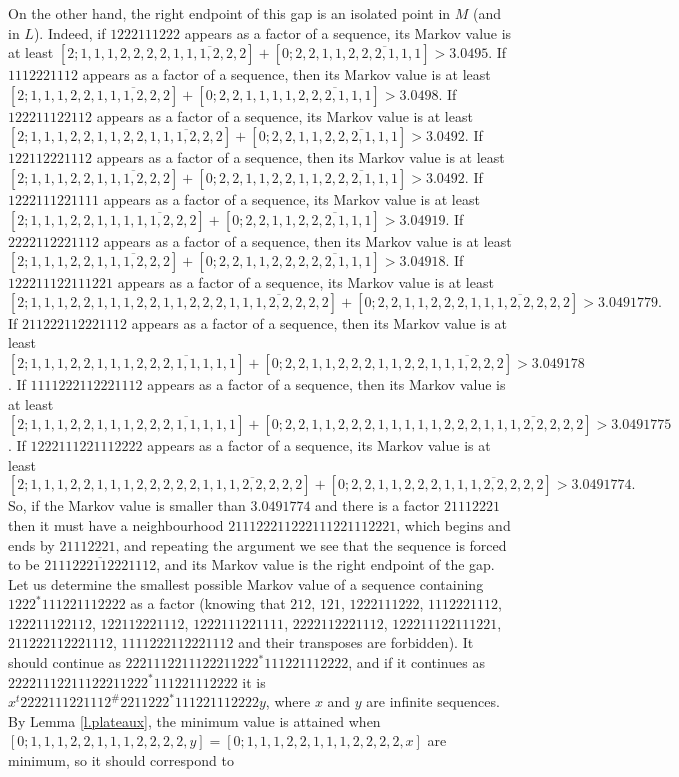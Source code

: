 \documentclass[10pt]{amsart}
\numberwithin{equation}{section}
\theoremstyle{definition}
\begin{document}
On the other hand, the right endpoint of this gap is an isolated point in $M$ (and in $L$). Indeed, if $1222111222$ appears as a factor of a sequence, its Markov value is at least $[2;1,1,1,2,2,2,2,\overline{1,1,1,2,2,2}]+[0;2,2,1,1,\overline{2,2,2,1,1,1}]>3.0495$. If $1112221112$ appears as a factor of a sequence, then its Markov value is at least $[2;1,1,1,2,2,\overline{1,1,1,2,2,2}]+[0;2,2,1,1,1,1,\overline{2,2,2,1,1,1}]>3.0498$. If $122211122112$ appears as a factor of a sequence, its Markov value is at least $[2;1,1,1,2,2,1,1,2,2,\overline{1,1,1,2,2,2}]+[0;2,2,1,1,\overline{2,2,2,1,1,1}]>3.0492$. If $122112221112$ appears as a factor of a sequence, then its Markov value is at least $[2;1,1,1,2,2,\overline{1,1,1,2,2,2}]+[0;2,2,1,1,2,2,1,1,\overline{2,2,2,1,1,1}]>3.0492$. If $1222111221111$ appears as a factor of a sequence, its Markov value is at least $[2;1,1,1,2,2,1,1,\overline{1,1,1,2,2,2}]+[0;2,2,1,1,\overline{2,2,2,1,1,1}]>3.04919$. If $2222112221112$ appears as a factor of a sequence, then its Markov value is at least $[2;1,1,1,2,2,\overline{1,1,1,2,2,2}]+[0;2,2,1,1,2,2,\overline{2,2,2,1,1,1}]>3.04918$. If $122211122111221$ appears as a factor of a sequence, its Markov value is at least $$[2;1,1,1,2,2,1,1,1,2,2,1,1,2,2,2,\overline{1,1,1,2,2,2,2,2}]+[0;2,2,1,1,2,2,2,\overline{1,1,1,2,2,2,2,2}]>3.0491779.$$ If $211222112221112$ appears as a factor of a sequence, then its Markov value is at least $[2;1,1,1,2,2,1,1,1,\overline{2,2,2,1,1,1,1,1}]+[0;2,2,1,1,2,2,2,1,1,2,2,\overline{1,1,1,2,2,2}]>3.049178$. If $1111222112221112$ appears as a factor of a sequence, then its Markov value is at least $[2;1,1,1,2,2,1,1,1,\overline{2,2,2,1,1,1,1,1}]+[0;2,2,1,1,2,2,2,1,1,1,1,1,2,2,2,\overline{1,1,1,2,2,2,2,2}]>3.0491775$. If $1222111221112222$ appears as a factor of a sequence, its Markov value is at least $$[2;1,1,1,2,2,1,1,1,2,2,2,2,2,\overline{1,1,1,2,2,2,2,2}]+[0;2,2,1,1,2,2,2,\overline{1,1,1,2,2,2,2,2}]>3.0491774.$$ So, if the Markov value is smaller than $3.0491774$ and there is a factor $21112221$ then it must have a neighbourhood $211122211222111221112221$, which begins and ends by $21112221$, and repeating the argument we see that the sequence is forced to be $\overline{2111222112221112}$, and its Markov value is the right endpoint of the gap. Let us determine the smallest possible Markov value of a sequence containing $1222^*111221112222$ as a factor (knowing that $212$, $121$, $1222111222$, $1112221112$, $122211122112$, $122112221112$, $1222111221111$, $2222112221112$, $122211122111221$, $211222112221112$, $1111222112221112$ and their transposes are forbidden). It should continue as $2221112211122211222^*111221112222$, and if it continues as $22221112211122211222^*111221112222$ it is $x^{t}2222111221112^{\#}2211222^*111221112222y$, where $x$ and $y$ are infinite sequences. By Lemma \ref{l.plateaux}, the minimum value is attained when $[0;1,1,1,2,2,1,1,1,2,2,2,2,y]=[0;1,1,1,2,2,1,1,1,2,2,2,2,x]$ are minimum, so it should correspond to 
\end{document}
